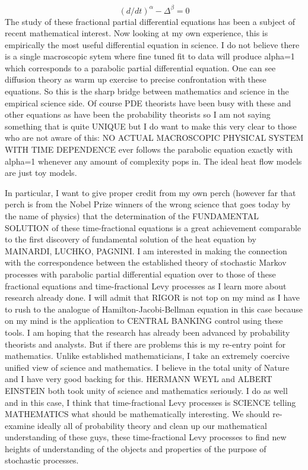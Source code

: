 \documentclass{amsart}
\begin{document}
\[
(d/dt)^{\alpha} - \Delta^{\beta} = 0
\]
The study of these fractional partial differential equations has been a subject of recent mathematical interest.  Now looking at my own experience, this is empirically the most useful differential equation in science.  I do not believe there is a single macroscopic sytem where fine tuned fit to data will produce alpha=1 which corresponds to a parabolic partial differential equation.  One can see diffusion theory as warm up exercise to precise confrontation with these equations.  So this is the sharp bridge between mathematics and science in the empirical science side.  Of course PDE theorists have been busy with these and other equations as have been the probability theorists so I am not saying something that is quite UNIQUE but I do want to make this very clear to those who are not aware of this:  NO ACTUAL MACROSCOPIC PHYSICAL SYSTEM WITH TIME DEPENDENCE ever follows the parabolic equation exactly with alpha=1 whenever any amount of complexity pops in.  The ideal heat flow models are just toy models.

In particular, I want to give proper credit from my own perch (however far that perch is from the Nobel Prize winners of the wrong science that goes today by the name of physics) that the determination of the FUNDAMENTAL SOLUTION of these time-fractional equations is a great achievement comparable to the first discovery of fundamental solution of the heat equation by MAINARDI, LUCHKO, PAGNINI.  I am interested in making the connection with the correspondence between the established theory of stochastic Markov processes with parabolic partial differential equation over to those of these fractional equations and time-fractional Levy processes as I learn more about research already done.  I will admit that RIGOR is not top on my mind as I have to rush to the analogue of Hamilton-Jacobi-Bellman equation in this case because on my mind is the application to CENTRAL BANKING control using these tools.  I am hoping that the research has already been advanced by probability theorists and analysts.  But if there are problems this is my re-entry point for mathematics.  Unlike established mathematicians, I take an extremely coercive unified view of science and mathematics.  I believe in the total unity of Nature and I have very good backing for this.  HERMANN WEYL and ALBERT EINSTEIN both took unity of science and mathematics seriously.  I do as well and in this case, I think that time-fractional Levy processes is SCIENCE telling MATHEMATICS what should be mathematically interesting.  We should re-examine ideally all of probability theory and clean up our mathematical understanding of these guys, these time-fractional Levy processes to find new heights of understanding of the objects and properties of the purpose of stochastic processes.
\end{document}
